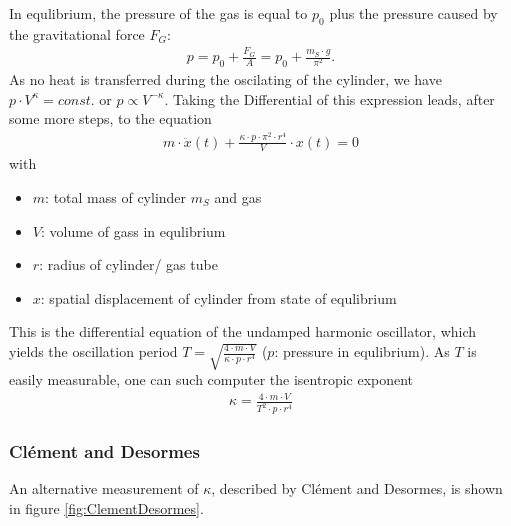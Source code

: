 \documentclass{subfiles}
\begin{document}
            \noindent In equlibrium, the pressure of the gas is equal to $p_0$ plus the pressure caused by the gravitational force $F_G$:
            \begin{align*}
                p=p_0+\frac{F_G}{A}=p_0+\frac{m_S\cdot g}{\pi^2}.
            \end{align*}
            As no heat is transferred during the oscilating of the cylinder, we have $p\cdot V^{\kappa}=const.$ or $p\propto V^{-\kappa}$. Taking the Differential of this expression leads, after some more steps, to the equation 
            \begin{align*}
                m\cdot \ddot x(t)+\frac{\kappa\cdot p\cdot \pi^2\cdot r^4}{V}\cdot x(t)=0
            \end{align*} 
            with
            \begin{itemize}
                \item $m$: total mass of cylinder $m_S$ and gas
                \item $V$: volume of gass in equlibrium
                \item $r$: radius of cylinder/ gas tube
                \item $x$: spatial displacement of cylinder from state of equlibrium
            \end{itemize}
            This is the differential equation of the undamped harmonic oscillator, which yields the oscillation period $T=\sqrt{\frac{4\cdot m\cdot V}{\kappa\cdot p\cdot r^4}}$ ($p$: pressure in equlibrium). As $T$ is easily measurable, one can such computer the isentropic exponent \cite[p.259-262]{skript}
            \begin{align}
                \kappa=\frac{4\cdot m\cdot V}{T^2\cdot p\cdot r^4}
                \label{eq:KappaCalculationFlammersfeld}
            \end{align}

        \subsubsection*{Clément and Desormes}\label{sec:ClementDesormes}
            An alternative measurement of $\kappa$, described by Clément and Desormes, is shown in figure \ref{fig:ClementDesormes}.
            
\end{document}
